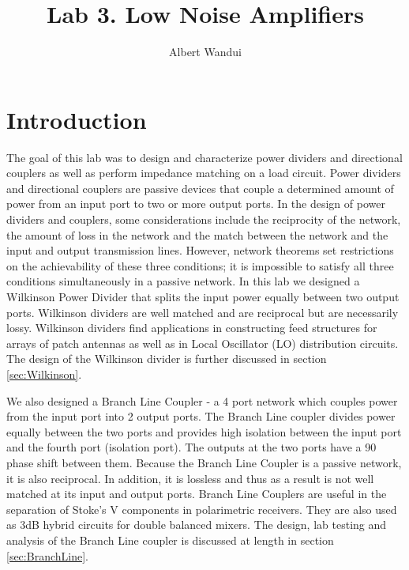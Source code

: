 \documentclass[twocolumn, aps, apl]{revtex4-1}
\begin{document}
\title{Lab 3. Low Noise Amplifiers }
\author{Albert Wandui}
\maketitle

\section*{Introduction}
The goal of this lab was to design and characterize power dividers and directional couplers as well as perform impedance matching on a load circuit. Power dividers and directional couplers are passive devices that couple a determined amount of power from an input port to two or more output ports. In the design of power dividers and couplers, some considerations include the reciprocity of the network, the amount of loss in the network and the match between the network and the input and output transmission lines. However, network theorems set restrictions on the achievability of these three conditions; it is impossible to satisfy all three conditions simultaneously in a passive network. In this lab we designed a Wilkinson Power Divider that splits the input power equally between two output ports. Wilkinson dividers are well matched and are reciprocal but are necessarily lossy. Wilkinson dividers find applications in constructing feed structures for arrays of patch antennas as well as in Local Oscillator (LO) distribution circuits. The design of the Wilkinson divider is further discussed in section \ref{sec:Wilkinson}.  

We also designed a Branch Line Coupler - a 4 port network which couples power from the input port into 2 output ports. The Branch Line coupler divides power equally between the two ports and provides high isolation between the input port and the fourth port (isolation port). The outputs at the two ports have a 90 \textdegree phase shift between them. Because the Branch Line Coupler is a passive network, it is also reciprocal. In addition, it is lossless and thus as a result is not well matched at its input and output ports. Branch Line Couplers are useful in the separation of Stoke's V components in polarimetric receivers. They are also used as 3dB hybrid circuits for double balanced mixers. The design, lab testing and analysis of the Branch Line coupler is discussed at length in section \ref{sec:BranchLine}.
\end{document}

